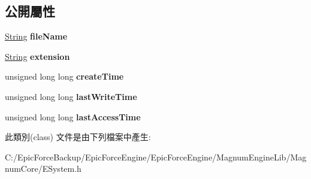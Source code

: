 \subsection*{公開屬性}
\begin{DoxyCompactItemize}
\item 
\hyperlink{class_magnum_1_1_string}{String} {\bfseries file\+Name}\hypertarget{class_magnum_1_1_system_1_1_file_ad9f6da6f81431d7ce16ddf77498a5494}{}\label{class_magnum_1_1_system_1_1_file_ad9f6da6f81431d7ce16ddf77498a5494}

\item 
\hyperlink{class_magnum_1_1_string}{String} {\bfseries extension}\hypertarget{class_magnum_1_1_system_1_1_file_a571d274d1ed15ec107b1ad84890b00bb}{}\label{class_magnum_1_1_system_1_1_file_a571d274d1ed15ec107b1ad84890b00bb}

\item 
unsigned long long {\bfseries create\+Time}\hypertarget{class_magnum_1_1_system_1_1_file_a670e3a63de510e3ce18cf0ea21fa5934}{}\label{class_magnum_1_1_system_1_1_file_a670e3a63de510e3ce18cf0ea21fa5934}

\item 
unsigned long long {\bfseries last\+Write\+Time}\hypertarget{class_magnum_1_1_system_1_1_file_ab4cf142d081c54663dbef936e0507857}{}\label{class_magnum_1_1_system_1_1_file_ab4cf142d081c54663dbef936e0507857}

\item 
unsigned long long {\bfseries last\+Access\+Time}\hypertarget{class_magnum_1_1_system_1_1_file_a6c3a184aef5dc0bbde5f22372d85e8b0}{}\label{class_magnum_1_1_system_1_1_file_a6c3a184aef5dc0bbde5f22372d85e8b0}

\end{DoxyCompactItemize}


此類別(class) 文件是由下列檔案中產生\+:\begin{DoxyCompactItemize}
\item 
C\+:/\+Epic\+Force\+Backup/\+Epic\+Force\+Engine/\+Epic\+Force\+Engine/\+Magnum\+Engine\+Lib/\+Magnum\+Core/E\+System.\+h\end{DoxyCompactItemize}
